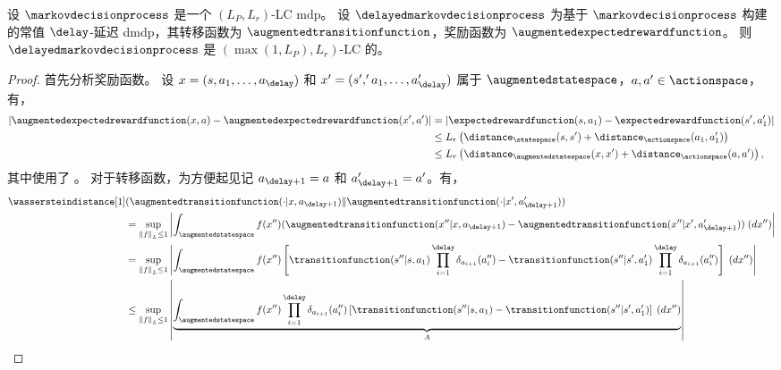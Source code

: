 \begin{prop}
\label{pp:lip_dmdp}
    设 $\markovdecisionprocess$ 是一个 $(L_P,L_r)$-LC \gls{mdp}。
    设 $\delayedmarkovdecisionprocess$ 为基于 $\markovdecisionprocess$ 构建的常值 $\delay$-延迟 \gls{dmdp}，其转移函数为 $\augmentedtransitionfunction$，奖励函数为 $\augmentedexpectedrewardfunction$。
    则 $\delayedmarkovdecisionprocess$ 是 $(\max(1,L_P),L_r)$-LC 的。
\end{prop}
\begin{proof}
    首先分析奖励函数。
    设 $x=(s,a_1,\dots,a_\delay)$ 和 $x'=(s','a_1,\dots,a_\delay')$ 属于 $\augmentedstatespace$，$a,a'\in\actionspace$，有，
    \begin{align*}
        \lvert \augmentedexpectedrewardfunction(x,a)-\augmentedexpectedrewardfunction(x',a')\rvert
        &= \lvert \expectedrewardfunction(s,a_1)-\expectedrewardfunction(s',a_1')\rvert
        \\
        &\le
        L_r \left( \distance_{\statespace}(s,s') + \distance_{\actionspace}(a_1,a_1')\right)
        \\
        &\le
        L_r \left( \distance_{\augmentedstatespace}(x,x') + \distance_{\actionspace}(a,a')\right),
    \end{align*}
    其中使用了 。
    对于转移函数，为方便起见记 $a_{\delay+1}=a$ 和 $a_{\delay+1}'=a'$。有，
    \begin{align*}
        \wassersteindistance[1]&(\augmentedtransitionfunction(\cdot\vert x,a_{\delay+1})\Vert \augmentedtransitionfunction(\cdot\vert x',a_{\delay+1}'))
        \\
        &= \sup_{\left\Vert f\right\Vert_L\leq 1} \left\vert \int_{\augmentedstatespace} f(x'')(\augmentedtransitionfunction(x''\vert x,a_{\delay+1})-\augmentedtransitionfunction(x''\vert x',a_{\delay+1}'))\; (dx'') \right\vert
        \\
        &= \sup_{\left\Vert f\right\Vert_L\leq 1} \left\vert \int_{\augmentedstatespace} f(x'')\left[\transitionfunction(s''\vert s,a_{1})\prod_{i=1}^{\delay}\delta_{a_{i+1}}(a_i'')-\transitionfunction(s''\vert s',a_{1}')\prod_{i=1}^{\delay}\delta_{a_{i+1}}(a_i'')\right]\; (dx'') \right\vert
        \\
        &\le \sup_{\left\Vert f\right\Vert_L\leq 1} \left\vert \underbrace{\int_{\augmentedstatespace} f(x'')\prod_{i=1}^{\delay}\delta_{a_{i+1}}(a_i'')\left[\transitionfunction(s''\vert s,a_{1})-\transitionfunction(s''\vert s',a_{1}')\right]\; (dx'')}_{A} \right\vert
        \\

\end{align*}
\end{proof}

